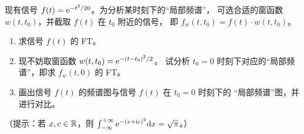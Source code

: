 \begin{exercise}
    现有信号 $f(t) = \mathrm{e}^{-t^2/20}$。为分析某时刻下的“局部频谱”，
    可选合适的窗函数 $w(t, t_0)$，并截取 $f(t)$ 在 $t_0$ 附近的信号，
    即 $f_w(t, t_0) = f(t)\cdot w(t, t_0)$。
    \begin{enumerate}[label=(\alph*)]
        \item 求信号 $f(t)$ 的 FT。
        \item 现不妨取窗函数 $w(t, t_0) = \mathrm{e}^{-(t - t_0)^2/2}$。
            试分析 $t_0 = 0$ 时刻下对应的“局部频谱”，即求 $f_w(t, 0)$ 的 FT。
        \item 画出信号 $f(t)$ 的频谱图与信号 $f(t)$ 在 $t_0 = 0$ 时刻下的
            “局部频谱”图，并进行对比。
    \end{enumerate}
    （提示：若 $x, c \in \mathbb{R}$，则 $\int_{-\infty}^{+\infty}\mathrm{e}^{-(x + \mathrm{i} c)^2}\mathrm{d}x = \sqrt{\pi}$。）
\end{exercise}

